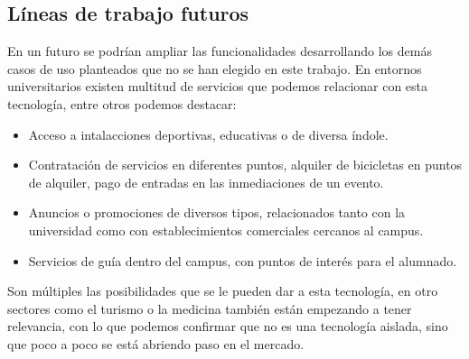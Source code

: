 \subsection{Líneas de trabajo futuros}


En un futuro se podrían ampliar las funcionalidades desarrollando los demás casos de uso planteados que no se han elegido en este trabajo. En entornos universitarios existen multitud de servicios que podemos relacionar con esta tecnología, entre otros podemos destacar: 


\begin{itemize}
\item Acceso a intalacciones deportivas, educativas o de diversa índole.
\item Contratación de servicios en diferentes puntos, alquiler de bicicletas en puntos de alquiler, pago de entradas en las inmediaciones de un evento.
\item Anuncios o promociones de diversos tipos, relacionados tanto con la universidad como con establecimientos comerciales cercanos al campus.
\item Servicios de guía dentro del campus, con puntos de interés para el alumnado.
\end{itemize}


Son múltiples las posibilidades que se le pueden dar a esta tecnología, en otro sectores como el turismo o la medicina también están empezando a tener relevancia, con lo que podemos confirmar que no es una tecnología aislada, sino que poco a poco se está abriendo paso en el mercado.









